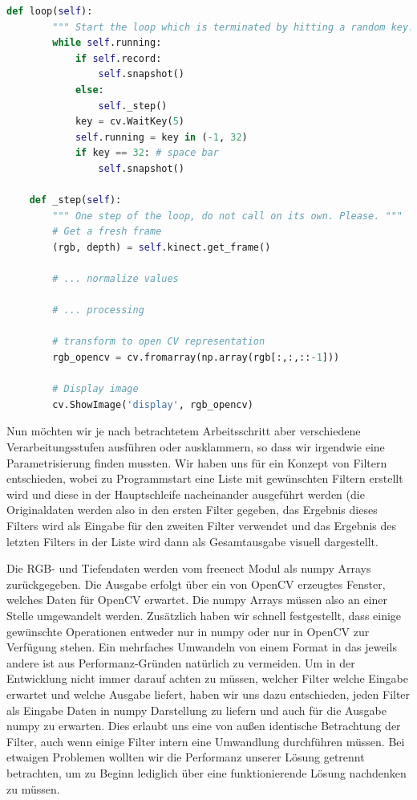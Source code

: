 \documentclass[12pt,a4paper,ngerman]{scrartcl}
\begin{document}
\begin{lstlisting}[language=Python, caption={Jeder Schleifendurchlauf entspricht einem Frame. Mit der SPACE Taste wird der aktuelle Frame als Bild gespeichert, jede andere Taste beendet die Schleife und somit das Programm.}]
    def loop(self):
        """ Start the loop which is terminated by hitting a random key. """
        while self.running:
            if self.record:
                self.snapshot()
            else:
                self._step()
            key = cv.WaitKey(5)
            self.running = key in (-1, 32)
            if key == 32: # space bar
                self.snapshot()

    def _step(self):
        """ One step of the loop, do not call on its own. Please. """
        # Get a fresh frame
        (rgb, depth) = self.kinect.get_frame()

        # ... normalize values

        # ... processing

        # transform to open CV representation
        rgb_opencv = cv.fromarray(np.array(rgb[:,:,::-1]))

        # Display image
        cv.ShowImage('display', rgb_opencv)

\end{lstlisting}



Nun möchten wir je nach betrachtetem Arbeitsschritt aber verschiedene
Verarbeitungsstufen ausführen oder ausklammern, so dass wir irgendwie eine
Parametrisierung finden mussten. Wir haben uns für ein Konzept von Filtern
entschieden, wobei zu Programmstart eine Liste mit gewünschten Filtern erstellt
wird und diese in der Hauptschleife nacheinander ausgeführt werden (die Originaldaten
werden also in den ersten Filter gegeben, das Ergebnis dieses Filters wird als
Eingabe für den zweiten Filter verwendet und das Ergebnis des letzten Filters
in der Liste wird dann als Gesamtausgabe visuell dargestellt.

Die RGB- und Tiefendaten werden vom freenect Modul als numpy Arrays zurückgegeben.
Die Ausgabe erfolgt über ein von OpenCV erzeugtes Fenster, welches Daten für
OpenCV erwartet. Die numpy Arrays müssen also an einer Stelle umgewandelt werden.
Zusätzlich haben wir schnell festgestellt, dass einige gewünschte Operationen
entweder nur in numpy oder nur in OpenCV zur Verfügung stehen. Ein mehrfaches
Umwandeln von einem Format in das jeweils andere ist aus Performanz-Gründen
natürlich zu vermeiden. Um in der Entwicklung nicht immer darauf achten zu müssen,
welcher Filter welche Eingabe erwartet und welche Ausgabe liefert, haben wir uns dazu
entschieden, jeden Filter als Eingabe Daten in numpy Darstellung zu liefern und auch
für die Ausgabe numpy zu erwarten. Dies erlaubt uns eine von außen identische
Betrachtung der Filter, auch wenn einige Filter intern eine Umwandlung durchführen
müssen. Bei etwaigen Problemen wollten wir die Performanz unserer Lösung getrennt
betrachten, um zu Beginn lediglich über eine funktionierende Lösung nachdenken
zu müssen.
\end{document}
